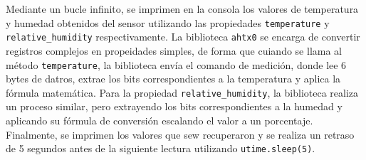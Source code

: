 \documentclass[letterpaper,12pt]{article}
\begin{document}
    Mediante un bucle infinito, se imprimen en la consola los valores de temperatura y humedad obtenidos del sensor utilizando las propiedades \texttt{temperature} y \texttt{relative\_humidity} respectivamente. La biblioteca \texttt{ahtx0} se encarga de convertir registros complejos en propeidades simples, de forma que cuiando se llama al método \texttt{temperature}, la biblioteca envía el comando de medición, donde lee 6 bytes de datros, extrae los bits correspondientes a la temperatura y aplica la fórmula matemática. Para la propiedad \texttt{relative\_humidity}, la biblioteca realiza un proceso similar, pero extrayendo los bits correspondientes a la humedad y aplicando su fórmula de conversión escalando el valor a un porcentaje. Finalmente, se imprimen los valores que sew recuperaron y se realiza un retraso de 5 segundos antes de la siguiente lectura utilizando \texttt{utime.sleep(5)}.
    
    \newpage
\end{document}
